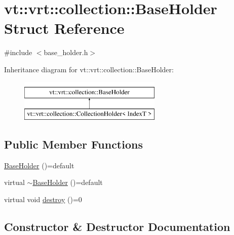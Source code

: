 \hypertarget{structvt_1_1vrt_1_1collection_1_1_base_holder}{}\section{vt\+:\+:vrt\+:\+:collection\+:\+:Base\+Holder Struct Reference}
\label{structvt_1_1vrt_1_1collection_1_1_base_holder}


{\ttfamily \#include $<$base\+\_\+holder.\+h$>$}

Inheritance diagram for vt\+:\+:vrt\+:\+:collection\+:\+:Base\+Holder\+:\begin{figure}[H]
\begin{center}
\leavevmode
\includegraphics[height=2.000000cm]{structvt_1_1vrt_1_1collection_1_1_base_holder}
\end{center}
\end{figure}
\subsection*{Public Member Functions}
\begin{DoxyCompactItemize}
\item 
\hyperlink{structvt_1_1vrt_1_1collection_1_1_base_holder_a748c42f9fcddba89eae7d55424080e4e}{Base\+Holder} ()=default
\item 
virtual \hyperlink{structvt_1_1vrt_1_1collection_1_1_base_holder_ada833ad6c17c031a818e331075a00c53}{$\sim$\+Base\+Holder} ()=default
\item 
virtual void \hyperlink{structvt_1_1vrt_1_1collection_1_1_base_holder_a56c8289f60121e38f3699bcfafbbd491}{destroy} ()=0
\end{DoxyCompactItemize}


\subsection{Constructor \& Destructor Documentation}
\mbox{\label{structvt_1_1vrt_1_1collection_1_1_base_holder_a748c42f9fcddba89eae7d55424080e4e}} 

